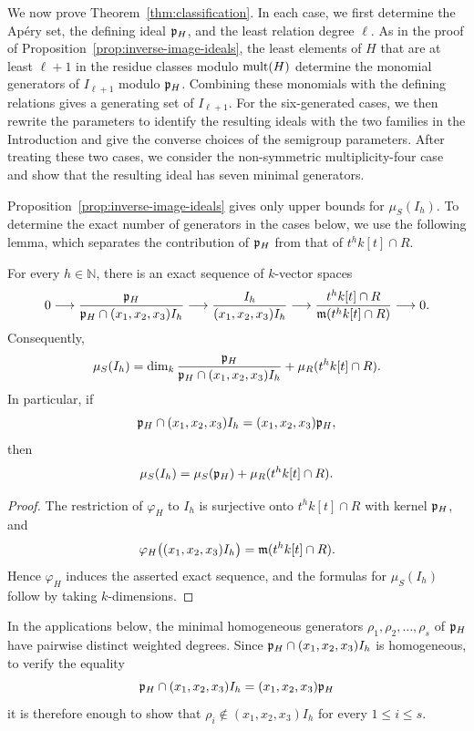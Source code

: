We now prove Theorem~\ref{thm:classification}.  In each case, we first determine the Ap\'ery set, the defining ideal $\mathfrak{p}_H$, and the least relation degree $\ell$.  As in the proof of Proposition~\ref{prop:inverse-image-ideals}, the least elements of $H$ that are at least $\ell+1$ in the residue classes modulo $\operatorname{mult}(H)$ determine the monomial generators of $I_{\ell+1}$ modulo $\mathfrak{p}_H$.  Combining these monomials with the defining relations gives a generating set of $I_{\ell+1}$.  For the six-generated cases, we then rewrite the parameters to identify the resulting ideals with the two families in the Introduction and give the converse choices of the semigroup parameters.  After treating these two cases, we consider the non-symmetric multiplicity-four case and show that the resulting ideal has seven minimal generators.


Proposition~\ref{prop:inverse-image-ideals} gives only upper bounds for
$\mu_S(I_h)$.  To determine the exact number of generators in the cases
below, we use the following lemma, which separates the contribution of
$\mathfrak{p}_H$ from that of $t^hk[t]\cap R$.

\begin{lemma}\label{lem:number-of-generators}
For every $h\in\mathbb N$, there is an exact sequence of $k$-vector spaces
\[
0\longrightarrow
\frac{\mathfrak{p}_H}{\mathfrak{p}_H\cap(x_1,x_2,x_3)I_h}
\longrightarrow
\frac{I_h}{(x_1,x_2,x_3)I_h}
\longrightarrow
\frac{t^hk[t]\cap R}{\mathfrak{m}(t^hk[t]\cap R)}
\longrightarrow0.
\]
Consequently,
\[
\mu_S(I_h)
=\dim_k\frac{\mathfrak{p}_H}{\mathfrak{p}_H\cap(x_1,x_2,x_3)I_h}
+\mu_R(t^hk[t]\cap R).
\]
In particular, if
\[
\mathfrak{p}_H\cap(x_1,x_2,x_3)I_h=(x_1,x_2,x_3)\mathfrak{p}_H,
\]
then
\[
\mu_S(I_h)=\mu_S(\mathfrak{p}_H)+\mu_R(t^hk[t]\cap R).
\]
\end{lemma}

\begin{proof}
The restriction of $\varphi_H$ to $I_h$ is surjective onto
$t^hk[t]\cap R$ with kernel $\mathfrak{p}_H$, and
\[
 \varphi_H\bigl((x_1,x_2,x_3)I_h\bigr)
 =\mathfrak{m}(t^hk[t]\cap R).
\]
Hence $\varphi_H$ induces the asserted exact sequence, and the formulas for
$\mu_S(I_h)$ follow by taking $k$-dimensions.
\end{proof}

In the applications below, the minimal homogeneous generators
$\rho_1,\rho_2,\ldots,\rho_s$ of $\mathfrak{p}_H$ have pairwise distinct weighted
degrees.  Since $\mathfrak{p}_H\cap(x_1,x_2,x_3)I_h$ is homogeneous, to verify the
equality
\[
\mathfrak{p}_H\cap(x_1,x_2,x_3)I_h=(x_1,x_2,x_3)\mathfrak{p}_H
\]
it is therefore enough to show that
$\rho_i\notin(x_1,x_2,x_3)I_h$ for every $1\leq i\leq s$.



